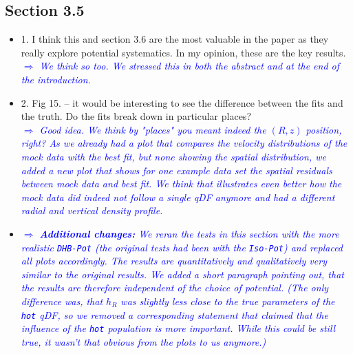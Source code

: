 \documentclass[10pt,a4paper]{article}
\newcommand{\Comment}[1]{\textsl{\textcolor{Blue}{$\Longrightarrow$ {#1}}}}
\begin{document}
\subsection{Section 3.5}
\begin{itemize}
\item 1. I think this and section 3.6 are the most valuable in the paper as they really explore potential systematics. In my opinion, these are the key results. \\\Comment{We think so too. We stressed this in both the abstract and at the end of the introduction.}
\item 2. Fig 15. -- it would be interesting to see the difference between the fits and the truth. Do the fits break down in particular places? \\\Comment{Good idea. We think by "places" you meant indeed the $(R,z)$ position, right? As we already had a plot that compares the velocity distributions of the mock data with the best fit, but none showing the spatial distribution, we added a new plot that shows for one example data set the spatial residuals between mock data and best fit. We think that illustrates even better how the mock data did indeed not follow a single qDF anymore and had a different radial and vertical density profile.}
\item \Comment{\textbf{Additional changes:} We reran the tests in this section with the more realistic \texttt{DHB-Pot} (the original tests had been with the \texttt{Iso-Pot}) and replaced all plots accordingly. The results are quantitatively and qualitatively very similar to the original results. We added a short paragraph pointing out, that the results are therefore independent of the choice of potential. (The only difference was, that $h_R$ was slightly less close to the true parameters of the \texttt{hot} qDF, so we removed a corresponding statement that claimed that the influence of the \texttt{hot} population is more important. While this could be still true, it wasn't that obvious from the plots to us anymore.)}
\end{itemize}
\end{document}
